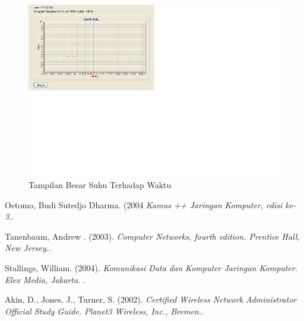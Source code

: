 \documentclass{jtetiproposalskripsi}
\begin{document}
\begin{figure}[ht!]
  \centering
    \includegraphics{gambar/3}
    \caption{Tampilan Besar Suhu Terhadap Waktu }
    \label{kripto}
\end{figure}






\begin{thebibliography}{9}

Oetomo, Budi Sutedjo Dharma. (2004 \emph{Kamus ++ Jaringan Komputer, edisi
ke-3.}.

Tanenbaum, Andrew . (2003). \emph{Computer Networks, fourth edition. Prentice Hall, New Jersey.}.

Stallings, William. (2004). \emph{Komunikasi Data dan Komputer Jaringan Komputer. Elex Media, Jakarta.
}.

Akin, D., Jones, J., Turner, S. (2002). \emph{Certified Wireless Network Administrator Official Study Guide. Planet3 Wireless, Inc., Bremen.}. 
 


\end{thebibliography}
\end{document}
